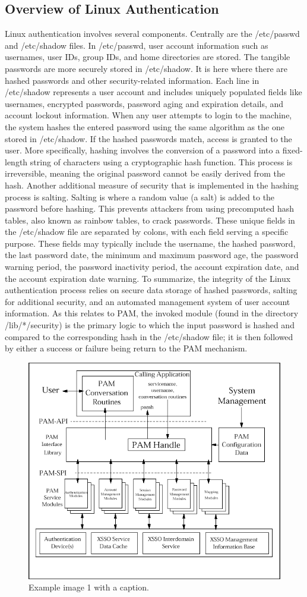 \documentclass[
]{article}
\begin{document}
\begin{multicols}{2}
\section{Overview of Linux Authentication}
Linux authentication involves several components. Centrally are the /etc/passwd and /etc/shadow files. In /etc/passwd, user account information such as usernames, user IDs, group IDs, and home directories are stored. The tangible passwords are more securely stored in /etc/shadow. It is here where there are hashed passwords and other security-related information. Each line in /etc/shadow represents a user account and includes uniquely populated fields like usernames, encrypted passwords, password aging and expiration details, and account lockout information. When any user attempts to login to the machine, the system hashes the entered password using the same algorithm as the one stored in /etc/shadow. If the hashed passwords match, access is granted to the user. More specifically, hashing involves the conversion of a password into a fixed-length string of characters using a cryptographic hash function. This process is irreversible, meaning the original password cannot be easily derived from the hash. Another additional measure of security that is implemented in the hashing process is salting. Salting is where a random value (a salt) is added to the password before hashing. This prevents attackers from using precomputed hash tables, also known as rainbow tables, to crack passwords. These unique fields in the /etc/shadow file are separated by colons, with each field serving a specific purpose. These fields may typically include the username, the hashed password, the last password date, the minimum and maximum password age, the password warning period, the password inactivity period, the account expiration date, and the account expiration date warning. To summarize, the integrity of the Linux authentication process relies on secure data storage of hashed passwords, salting for additional security, and an automated management system of user account information. As this relates to PAM, the invoked module (found in the directory /lib/*/security) is the primary logic to which the input password is hashed and compared to the corresponding hash in the /etc/shadow file; it is then followed by either a success or failure being return to the PAM mechanism.

\end{multicols}

\begin{figure}[htbp]
  \centering
  \includegraphics[width=0.4\linewidth]{pam_configuration.png}
  \caption{Example image 1 with a caption.}
\end{figure}
\end{document}

